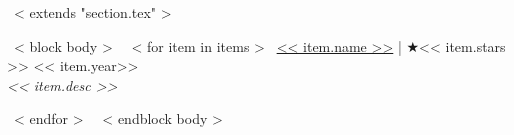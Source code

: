 ~< extends "section.tex" >~

~< block body >~
  ~< for item in items >~
    \href{<< item.repo_url >>}{<< item.name >>} | $\bigstar$<< item.stars >> \hfill
    {\small \color{teal} << item.year>>} \\[0.1mm]
    {\scriptsize \color{gray} \emph{<< item.desc >>} }\par \vspace*{0.2cm}
  ~< endfor >~
~< endblock body >~

